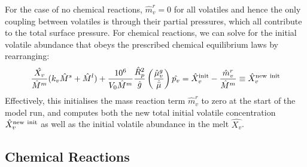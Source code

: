 For the case of no chemical reactions, $\hat{m}_v^r=0$ for all volatiles and hence the only coupling between volatiles is through their partial pressures, which all contribute to the total surface pressure.  For chemical reactions, we can solve for the initial volatile abundance that obeys the prescribed chemical equilibrium laws by rearranging:
\begin{equation}
\frac{\hat{X_v}}{\hat{M}^m} (k_v \hat{M}^s + \hat{M}^l) + \frac{10^6}{V_0 \hat{M}^m} \frac{\hat{R}_p^2}{\hat{g}} \left( \frac{\hat{\mu}_v^g}{\hat{\bar{\mu}}} \right)\hat{p_v} = \hat{X}_v^{\rm init} - \frac{\hat{m}_v^r}{\hat{M}^m} \equiv \hat{X}_v^{\rm new\ init} 
\label{eq:volinit3}
\end{equation}
Effectively, this initialises the mass reaction term $\hat{m}^r_v$ to zero at the start of the model run, and computes both the new total initial volatile concentration $\hat{X}_v^{\rm new\ init}$ as well as the initial volatile abundance in the melt $\hat{X_v}$.  
\subsection{Chemical Reactions}
\label{sect:chemreact}
